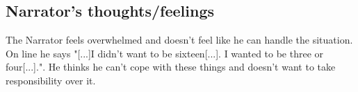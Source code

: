 \documentclass{article}
\begin{document}
\subsection{Narrator's thoughts/feelings}
The Narrator feels overwhelmed and doesn't feel like he can handle the situation.
On line he says "[...]I didn't want to be sixteen[...]. I wanted to be three or four[...].". He thinks he can't cope with these things and doesn't want to take responsibility over it.
\end{document}
